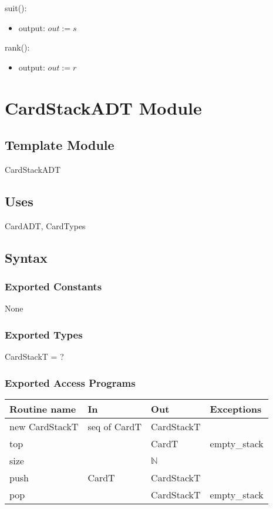 \documentclass[12pt,fleqn]{article}
\begin{document}
\noindent suit():
\begin{itemize}
\item output: $out := s$
\end{itemize}

\noindent rank():
\begin{itemize}
\item output: $out := r$
\end{itemize}

\newpage
\section* {CardStackADT Module}

\subsection* {Template Module}

CardStackADT

\subsection* {Uses}

CardADT, CardTypes

\subsection* {Syntax}

\subsubsection* {Exported Constants}
None

\subsubsection* {Exported Types}

CardStackT = ?

\subsubsection* {Exported Access Programs}

\begin{tabular}{| l | l | l | l |}
\hline
\textbf{Routine name} & \textbf{In} & \textbf{Out} & \textbf{Exceptions}\\
\hline
new CardStackT & seq of CardT & CardStackT & ~\\
\hline
top & ~ & CardT & empty\_stack\\
\hline
size & ~ & $\mathbb{N}$ & ~\\
\hline
push & CardT & CardStackT & ~\\
\hline
pop & ~ & CardStackT & empty\_stack\\
\hline 

\end{tabular}
\end{document}
